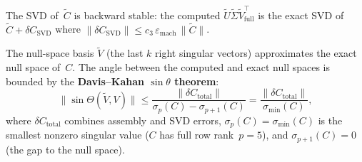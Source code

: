 \begin{lemma}\label{lem:link-svd}
The SVD of~$\tilde C$ is backward stable: the computed
$\tilde U \tilde\Sigma \tilde V_{\mathrm{full}}^\top$
is the exact SVD of $\tilde C + \delta C_{\mathrm{SVD}}$
where $\|\delta C_{\mathrm{SVD}}\| \leq c_3\, \varepsilon_{\mathrm{mach}}\, \|\tilde C\|$.

The null-space basis $\tilde V$ (the last $k$ right singular vectors)
approximates the exact null space of~$C$.
The angle between the computed and exact null spaces is bounded by
the \textbf{Davis--Kahan $\sin\theta$ theorem}:
\[
  \|\sin\Theta(\tilde V, V)\|
  \leq \frac{\|\delta C_{\mathrm{total}}\|}
       {\sigma_p(C) - \sigma_{p+1}(C)}
  = \frac{\|\delta C_{\mathrm{total}}\|}
       {\sigma_{\min}(C)},
\]
where $\delta C_{\mathrm{total}}$ combines assembly and SVD errors,
$\sigma_p(C) = \sigma_{\min}(C)$ is the smallest nonzero singular
value ($C$ has full row rank~$p = 5$),
and $\sigma_{p+1}(C) = 0$ (the gap to the null space).

\end{lemma}


